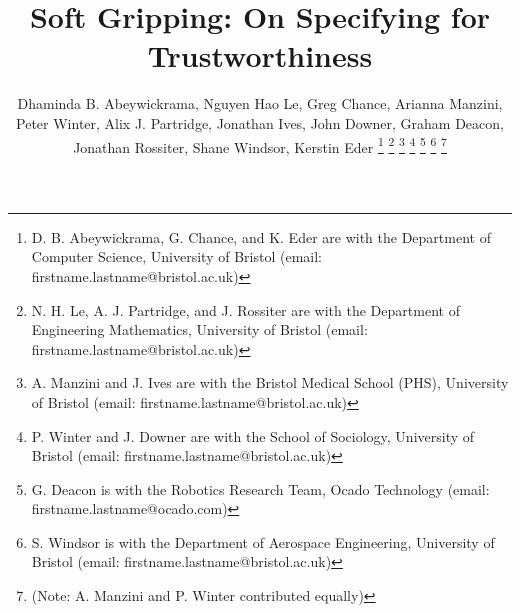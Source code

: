 \documentclass[lettersize,journal]{IEEEtran}
\begin{document}
\linenumbers
\linenumbersep 10pt
\title{Soft Gripping: On Specifying for Trustworthiness}

\author{Dhaminda B. Abeywickrama, Nguyen Hao Le, Greg Chance, Arianna Manzini, Peter Winter, Alix J. Partridge, Jonathan Ives, John Downer, Graham Deacon, Jonathan Rossiter, Shane Windsor, Kerstin Eder
	\thanks{D. B. Abeywickrama, G. Chance, and K. Eder are with the Department of Computer Science, University of Bristol (email: firstname.lastname@bristol.ac.uk)}
	\thanks{N. H. Le, A. J. Partridge, and J. Rossiter are with the Department of Engineering Mathematics, University of Bristol (email: firstname.lastname@bristol.ac.uk)}
	\thanks{A. Manzini and J. Ives are with the Bristol Medical School (PHS), University of Bristol (email: firstname.lastname@bristol.ac.uk)}
	\thanks{P. Winter and J. Downer are with the School of Sociology, University of Bristol (email: firstname.lastname@bristol.ac.uk)}
	\thanks{G. Deacon is with the Robotics Research Team, Ocado Technology (email: firstname.lastname@ocado.com)}
	\thanks{S. Windsor is with the Department of Aerospace Engineering, University of Bristol (email: firstname.lastname@bristol.ac.uk)}
	\thanks{(Note: A. Manzini and P. Winter contributed equally)}}
\end{document}
